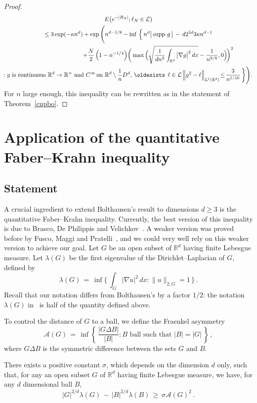 \documentclass[AHL, Unicode, longabstracts, published]{cedram}
\newcommand*\supp{\text{supp\,}}
\newcommand*\Rd {{\mathbb R^d}}
\newcommand*\R{\mathbb{R}}
\newcommand{\cA}{\mathcal{A}}
\newcommand{\cL}{\mathcal{L}}
\renewcommand*{\exists}{\mathrel{\oldexists}}
\begin{document}
\begin{proof}
\begin{multline*}
E\big(e^{-|R_N|};
\ell_N\in\cL\big)\\
\leq 3\exp(-\kappa n^d)+\exp\Bigg(n^{d-1/8}
-\inf\,\Big\{\, n^d
\big|\,\supp\,g\,\big|
\,-\, {d2^{5d}} {3\kappa}{n^{d-1}}
\\
\mkern180mu+ \frac{N} {2} \left(1-n^{-1/4}\right)\!
\bigg(\max\Big(
\sqrt{\frac{1}{dn^2}\int_{\Rd}\big|\nabla g\big|^2\,dx }-
\frac{1}{n^{9/8}},0\Big)\!\bigg)^2
\\\!:g\text{ is continuous } \Rd\to\R^+
\text{ and }C^\infty\!\text{ on }\Rd\setminus \frac{1}{n}D^d,\,
\exists\,\ell\in\cL\,
\Big\|g^2- \ell\Big\|_{L^1(\Rd)}
\!\leq\!
\frac{3}{n^{1/16}}
\,\bigg\}\Bigg).
\end{multline*}
For $n$ large enough, this inequality can be rewritten as in the statement of Theorem~\ref{cupbo}.
\end{proof}

\section{Application of the quantitative Faber--Krahn inequality}\label{S:FK}

\subsection{Statement}
A crucial ingredient to extend Bolthausen's result to dimensions $d\geq 3$ is the quantitative Faber--Krahn inequality. Currently, the best version of this inequality is due to Brasco, De Philippis and Velichkov~\cite{BLGV}. A weaker version was proved before by Fusco, Maggi and Pratelli~\cite{FMP}, and we could very well rely on this weaker version to achieve our goal. Let $G$ be an open subset of $\Rd$ having finite Lebesgue measure. Let $\lambda(G)$ be the first eigenvalue of the Dirichlet--Laplacian of $G$, defined by
\[
\lambda(G)\,=\,\inf\Big\{\,\int_G\big|\nabla u\big|^2\,dx:\|u\|_{2,G}=1\,\Big\}\,.
\]
Recall that our notation differs from Bolthausen's by a factor $1/2$: the notation $\lambda(G)$ in~\cite{BO} is half of the quantity defined above.



 To control the distance of $G$ to a ball, we define the Fraenkel asymmetry
\[
\cA(G)\,=\,\inf\left\{\,\frac{|G\Delta B|}{|B|}:
B\text{ ball such that }|B|=|G|\,\right\}\,,
\]
where $G\Delta B$ is the symmetric difference between the sets $G$ and $B$.
\begin{theo}\label{fmp}
There exists a positive constant $\sigma$, which depends on the dimension $d$ only, such that, for any an open subset $G$ of $\Rd$ having finite Lebesgue measure, we have, for any $d$ dimensional ball $B$,
\[
|G|^{2/d}\lambda(G)\,-\,
|B|^{2/d}\lambda(B)\,\geq\,\sigma\cA(G)^2\,.
\]
\end{theo}
\end{document}
